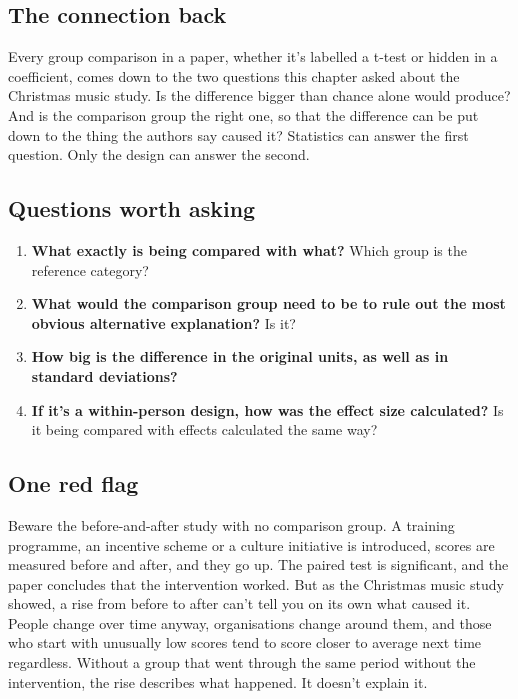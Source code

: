 \documentclass[
]{book}
\providecommand{\tightlist}{%
  \setlength{\itemsep}{0pt}\setlength{\parskip}{0pt}}
\begin{document}
\subsection{The connection back}\label{the-connection-back-5}

Every group comparison in a paper, whether it's labelled a t-test or hidden in a coefficient, comes down to the two questions this chapter asked about the Christmas music study. Is the difference bigger than chance alone would produce? And is the comparison group the right one, so that the difference can be put down to the thing the authors say caused it? Statistics can answer the first question. Only the design can answer the second.

\subsection{Questions worth asking}\label{questions-worth-asking-5}

\begin{enumerate}
\def\labelenumi{\arabic{enumi}.}
\tightlist
\item
  \textbf{What exactly is being compared with what?} Which group is the reference category?
\item
  \textbf{What would the comparison group need to be to rule out the most obvious alternative explanation?} Is it?
\item
  \textbf{How big is the difference in the original units, as well as in standard deviations?}
\item
  \textbf{If it's a within-person design, how was the effect size calculated?} Is it being compared with effects calculated the same way?
\end{enumerate}

\subsection{One red flag}\label{one-red-flag-5}

Beware the before-and-after study with no comparison group. A training programme, an incentive scheme or a culture initiative is introduced, scores are measured before and after, and they go up. The paired test is significant, and the paper concludes that the intervention worked. But as the Christmas music study showed, a rise from before to after can't tell you on its own what caused it. People change over time anyway, organisations change around them, and those who start with unusually low scores tend to score closer to average next time regardless. Without a group that went through the same period without the intervention, the rise describes what happened. It doesn't explain it.
\end{document}
